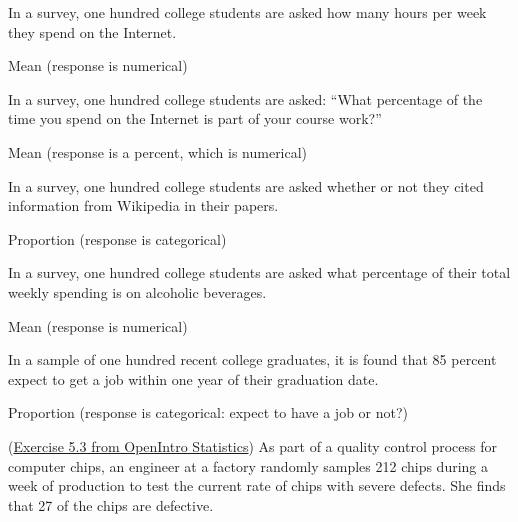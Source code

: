 \documentclass[12pt,answers]{exam}
\begin{document}
\begin{questions}
  \begin{parts}
  \item
    In a survey, one hundred college students are asked how many hours
    per week they spend on the Internet.
\begin{solution}
Mean (response is numerical)
\end{solution}
\vfill
  \item
    In a survey, one hundred college students are asked: ``What
    percentage of the time you spend on the Internet is part of your
    course work?''
\begin{solution}
Mean (response is a percent, which is numerical)
\end{solution}
\vfill
  \item
    In a survey, one hundred college students are asked whether or not
    they cited information from Wikipedia in their papers.
\begin{solution}
Proportion (response is categorical)
\end{solution}
\vfill
  \item
    In a survey, one hundred college students are asked what percentage
    of their total weekly spending is on alcoholic beverages.
\begin{solution}
Mean (response is numerical)
\end{solution}
\vfill
  \item
    In a sample of one hundred recent college graduates, it is found
    that 85 percent expect to get a job within one year of their
    graduation date.
\begin{solution}
Proportion (response is categorical: expect to have a job or not?)
\end{solution}
\vfill
  \end{parts}
\newpage
\item
  (\href{http://people.hsc.edu/faculty-staff/blins/books/OpenIntroStats4e.pdf\#eoce.5.3}{Exercise 5.3 from OpenIntro Statistics}) As part of a quality control process for computer chips, an engineer
  at a factory randomly samples 212 chips during a week of production to
  test the current rate of chips with severe defects. She finds that 27
  of the chips are defective.


\end{questions}
\end{document}
